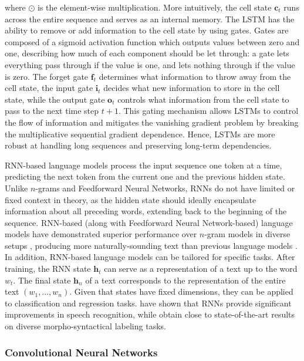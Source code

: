 \noindent where $\odot$ is the element-wise multiplication. More intuitively, the cell state $\bm{c}_t$ runs across the entire sequence and serves as an internal memory. The LSTM has the ability to remove or add information to the cell state by using gates. Gates are composed of a sigmoid activation function which outputs values between zero and one, describing how much of each component should be let through: a gate lets everything pass through if the value is one, and lets nothing through if the value is zero. The forget gate $\bm{f}_t$ determines what information to throw away from the cell state, the input gate $\bm{i}_t$ decides what new information to store in the cell state, while the output gate $\bm{o}_t$ controls what information from the cell state to pass to the next time step $t+1$. This gating mechanism allows \acp{LSTM} to control the flow of information and mitigates the vanishing gradient problem by breaking the multiplicative sequential gradient dependence. Hence, \acp{LSTM} are more robust at handling long sequences and preserving long-term dependencies.

\ac{RNN}-based language models process the input sequence one token at a time, predicting the next token from the current one and the previous hidden state. Unlike $n$-grams and Feedforward Neural Networks, \acp{RNN} do not have limited or fixed context in theory, as the hidden state should ideally encapsulate information about all preceding words, extending back to the beginning of the sequence.
\ac{RNN}-based (along with Feedforward Neural Network-based) language models have demonstrated superior performance over $n$-gram models in diverse setups \citep{mikolov2010recurrent}, producing more naturally-sounding text than previous language models \citep{kovavcevic2022bidirectional}. In addition, \ac{RNN}-based language models can be tailored for specific tasks. After training, the \ac{RNN} state $\bm{h}_t$ can serve as a representation of a text up to the word $w_t$. The final state $\bm{h}_{n}$ of a text corresponds to the representation of the entire text $(w_1, \ldots, w_n)$. Given that states have fixed dimensions, they can be applied to classification and regression tasks. \citet{schwenk2007continuous} have shown that \acp{RNN} provide significant improvements in speech recognition, while \citet{collobert2011deep} obtain close to state-of-the-art results on diverse morpho-syntactical labeling tasks.

\subsubsection{Convolutional Neural Networks}

